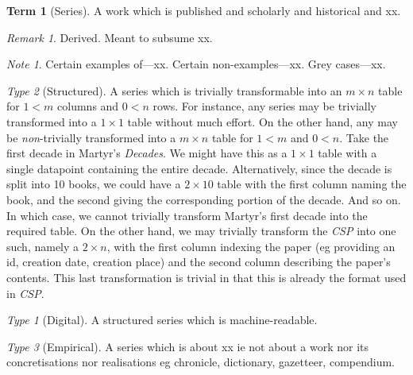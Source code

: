 \documentclass{amsart}%
\newcommand{\titleit}[1]{\textit{#1}}%
\theoremstyle{plain}
\theoremstyle{definition}
\theoremstyle{remark}
\newtheorem*{note}{Note}
\theoremstyle{definition}
\newtheorem{term}{Term}[subsection]%
\theoremstyle{remark}
\newtheorem*{term-type}{Type}
\newtheorem*{term-note}{Remark}
\begin{document}
\begin{term}[Series]
\label{term:series}
A work which is published and scholarly and historical and xx.
\begin{term-note}
Derived. Meant to subsume xx.
\end{term-note}
\begin{note}
Certain examples of---xx. Certain non-examples---xx. Grey cases---xx.
\end{note}
\begin{term-type}[Structured]
A series which is trivially transformable into an \(m\times n\) table for \(1<m\) columns and \(0<n\) rows. For instance, any series may be trivially transformed into a \(1\times 1\) table without much effort. On the other hand, any may be \emph{non}-trivially transformed into a \(m\times n\) table for \(1<m\) and \(0<n\). Take the first decade in Martyr's \titleit{Decades}. We might have this as a \(1\times 1\) table with a single datapoint containing the entire decade. Alternatively, since the decade is split into 10 books, we could have a \(2\times 10\) table with the first column naming the book, and the second giving the corresponding portion of the decade. And so on. In which case, we cannot trivially transform Martyr's first decade into the required table. On the other hand, we may trivially transform the \titleit{CSP} into one such, namely a \(2\times n\), with the first column indexing the paper (eg providing an id, creation date, creation place) and the second column describing the paper's contents. This last transformation is trivial in that this is already the format used in \titleit{CSP}.
\begin{term-type}[Digital]
A structured series which is machine-readable.%
\end{term-type}%
\end{term-type}%
\begin{term-type}[Empirical]
A series which is about xx ie not about a work nor its concretisations nor realisations eg chronicle, dictionary, gazetteer, compendium.
\end{term-type}
\end{term}
%
%
%
\end{document}
